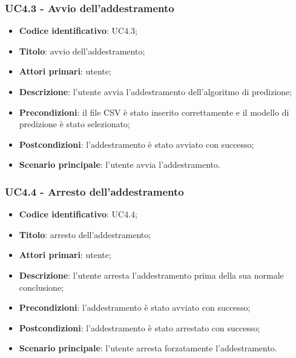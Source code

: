 \subsubsection{UC4.3 - Avvio dell'addestramento}
\begin{itemize}
    \item \textbf{Codice identificativo}: UC4.3;
    \item \textbf{Titolo}: avvio dell'addestramento;
    \item \textbf{Attori primari}: utente;
    \item \textbf{Descrizione}: l'utente avvia l'addestramento dell'algoritmo di predizione;
    \item \textbf{Precondizioni}: il file CSV è stato inserito correttamente e il modello di predizione è stato selezionato;
    \item \textbf{Postcondizioni}: l'addestramento è stato avviato con successo;
    \item \textbf{Scenario principale}: l'utente avvia l'addestramento.
\end{itemize}

\subsubsection{UC4.4 - Arresto dell'addestramento}
\begin{itemize}
	\item \textbf{Codice identificativo}: UC4.4;
	\item \textbf{Titolo}: arresto dell'addestramento;
	\item \textbf{Attori primari}: utente;
	\item \textbf{Descrizione}: l'utente arresta l'addestramento prima della sua normale conclusione;
	\item \textbf{Precondizioni}: l'addestramento è stato avviato con successo;
	\item \textbf{Postcondizioni}: l'addestramento è stato arrestato con successo;
	\item \textbf{Scenario principale}: l'utente arresta forzatamente l'addestramento.
\end{itemize}


